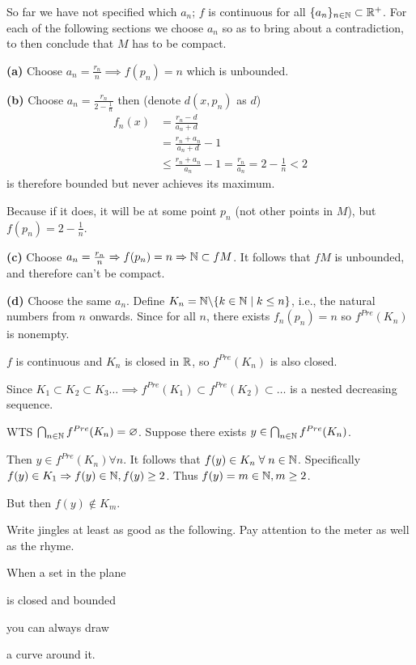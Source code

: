 \documentclass[a4paper, 12pt]{article}
\begin{document}
\begin{solution}
    So far we have not specified which $a_n$; $f$ is continuous for all $\{a_n\}_{n \in \mathbb{N}} \subset \mathbb{R}^+$. For each of the following sections we choose $a_n$ so as to bring about a contradiction, to then conclude that $M$ has to be compact.

    \textbf{(a)} Choose $a_n = \frac{r_n}{n} \implies f(p_n) = n$ which is unbounded. \contra

    \textbf{(b)} Choose $a_n = \frac{r_n}{2 - \frac{1}{n}}$ then (denote $d(x, p_n)$ as $d$)
    \begin{align*}
        f_n(x) & = \frac{r_n - d}{a_n + d}                                              \\
               & = \frac{r_n + a_n}{a_n + d} - 1                                        \\
               & \leq \frac{r_n + a_n}{a_n} - 1 = \frac{r_n}{a_n} = 2 - \frac{1}{n} < 2
    \end{align*}
    is therefore bounded but never achieves its maximum.

    Because if it does, it will be at some point $p_n$ (not other points in $M$), but $f(p_n) = 2 - \frac{1}{n}$. \contra

    \textbf{(c)} Choose $a_n = \frac{r_n}{n} \Rightarrow f(p_n) = n \Rightarrow \mathbb{N} \subset fM$. It follows that $fM$ is unbounded, and therefore can't be compact. \contra

    \textbf{(d)} Choose the same $a_n$. Define $K_n = \mathbb{N} \backslash \{k \in \mathbb{N} \mid k \leq n\}$, i.e., the natural numbers from $n$ onwards. Since for all $n$, there exists $f_n(p_n) = n$ so $f^{Pre}(K_n)$ is nonempty.

    $f$ is continuous and $K_n$ is closed in $\mathbb{R}$, so $f^{Pre}(K_n)$ is also closed.

    Since $K_1 \subset K_2 \subset K_3 \dots \implies f^{Pre}(K_1) \subset f^{Pre}(K_2) \subset \dots$ is a nested decreasing sequence.

    WTS $\bigcap_{n \in \mathbb{N}}f^{Pre}(K_n) = \varnothing$. Suppose there exists $y \in \bigcap_{n \in \mathbb{N}}f^{Pre}(K_n)$.

    Then $y \in f^{Pre}(K_n) \forall n$. It follows that $f(y) \in K_n \forall n \in \bbn$. Specifically $f(y) \in K_1 \Rightarrow f(y) \in \mathbb{N}, f(y) \geq 2$. Thus $f(y) = m \in \mathbb{N}, m \geq 2$.

    But then $f(y) \not \in K_m$. \contra
\end{solution}

\begin{problem} [2.152]
Write jingles at least as good as the following. Pay attention to the meter as well as the rhyme.

\begin{center}
    When a set in the plane

    is closed and bounded

    you can always draw

    a curve around it.
\end{center}
\end{problem}
\begin{solution}
\end{solution}
\end{document}
